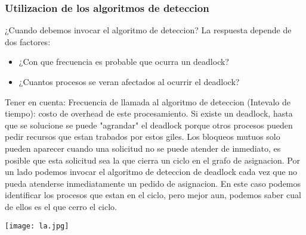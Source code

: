\documentclass[a4paper,10pt]{article}
\begin{document}
\subsubsection{Utilizacion de los algoritmos de deteccion}
¿Cuando debemos invocar el algoritmo de deteccion? La respuesta depende de dos factores:
\begin{itemize}
 \item ¿Con que frecuencia es probable que ocurra un deadlock?
 \item ¿Cuantos procesos se veran afectados al ocurrir el deadlock?
\end{itemize}
Tener en cuenta:
Frecuencia de llamada al algoritmo de deteccion (Intevalo de tiempo): costo de overhead de este procesamiento.
Si existe un deadlock, hasta que se solucione se puede "agrandar" el deadlock porque otros procesos pueden pedir recursos que estan trabados por estos giles.
Los bloqueos mutuos solo pueden aparecer cuando una solicitud no se puede atender de inmediato, es posible que esta solicitud sea la que cierra un ciclo en el grafo de asignacion. Por un lado podemos invocar el algoritmo de deteccion de deadlock cada vez que no pueda atenderse inmediatamente un pedido de asignacion. En este caso podemos identificar los procesos que estan en el ciclo, pero mejor aun, podemos saber cual de ellos es el que cerro el ciclo.



\begin{center}
\texttt{[image: la.jpg]}
\end{center} 
\end{document}
